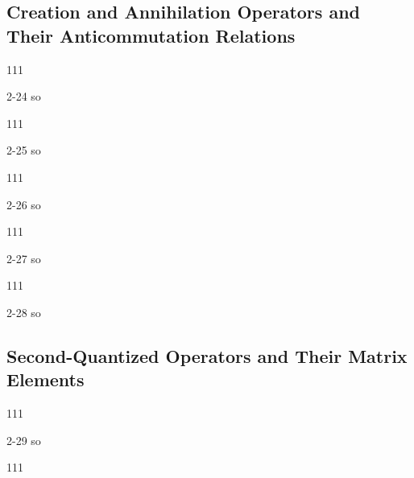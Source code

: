 \documentclass[a4paper]{book}
\begin{document}
	\subsection{Creation and Annihilation Operators and Their Anticommutation Relations}
	
	\begin{exercise}
	111
	\end{exercise}
	
	\begin{solution}
		2-24 so
	\end{solution}
	
	\begin{exercise}
	111
	\end{exercise}
	
	\begin{solution}
		2-25 so
	\end{solution}
	
	\begin{exercise}
	111
	\end{exercise}
	
	\begin{solution}
		2-26 so
	\end{solution}

	\begin{exercise}
	111
	\end{exercise}
	
	\begin{solution}
		2-27 so
	\end{solution}
	
	\begin{exercise}
	111
	\end{exercise}
	
	\begin{solution}
		2-28 so
	\end{solution}
	
	\subsection{Second-Quantized Operators and Their Matrix Elements}
	
	\begin{exercise}
	111
	\end{exercise}
	
	\begin{solution}
		2-29 so
	\end{solution}
	
	\begin{exercise}
	111
	\end{exercise}
	
\end{document}
